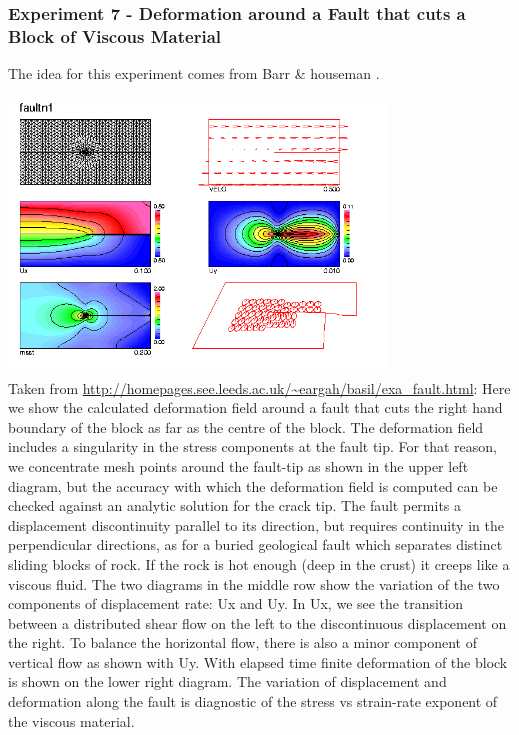 \newpage
\subsubsection*{Experiment 7 - Deformation around a Fault that cuts a Block of Viscous Material}

The idea for this experiment comes from Barr \& houseman \cite{baho92,baho96}.


\begin{center}
\includegraphics[width=10cm]{python_codes/fieldstone_87/images/baho}\\
{\captionfont Taken from 
\url{http://homepages.see.leeds.ac.uk/~eargah/basil/exa_fault.html}: 
Here we show the calculated deformation field around a fault that cuts the right 
hand boundary of the block as far as the centre of the block.  The deformation field 
includes a singularity in the stress components at the fault tip.  For that reason, 
we concentrate mesh points around the fault-tip as shown in the upper left diagram, 
but the accuracy with which the deformation field is computed can be checked against 
an analytic solution for the crack tip.  The fault permits a displacement discontinuity 
parallel to its direction, but requires continuity in the perpendicular directions, 
as for a buried geological fault which separates distinct sliding blocks of rock.  
If the rock is hot enough (deep in the crust) it creeps like a viscous fluid. 
The two diagrams in the middle row show the variation of the two components of displacement rate: 
Ux and Uy.  In Ux, we see the transition between a distributed shear flow on the left to the 
discontinuous displacement on the right.  To balance the horizontal flow, there is also a minor 
component of vertical flow as shown with Uy.  With elapsed time finite deformation of the block 
is shown on the lower right diagram.  The variation of displacement and deformation along the fault 
is diagnostic of the stress vs strain-rate exponent of the viscous material. 
}
\end{center}

